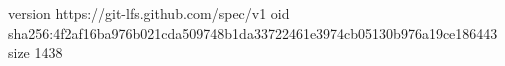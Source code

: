 version https://git-lfs.github.com/spec/v1
oid sha256:4f2af16ba976b021cda509748b1da33722461e3974cb05130b976a19ce186443
size 1438
